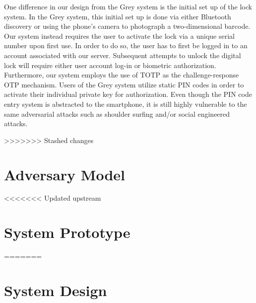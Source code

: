 \documentclass[conference]{IEEEtran}
\begin{document}
	One difference in our design from the Grey system is the initial set up of the lock system. In the Grey system, this initial set up is done via either Bluetooth discovery or using the phone’s camera to photograph a two-dimensional barcode. Our system instead requires the user to activate the lock via a unique serial number upon first use. In order to do so, the user has to first be logged in to an account associated with our server. Subsequent attempts to unlock the digital lock will require either user account log-in or biometric authorization. Furthermore, our system employs the use of TOTP as the challenge-response OTP mechanism. Users of the Grey system utilize static PIN codes in order to activate their individual private key for authorization. Even though the PIN code entry system is abstracted to the smartphone, it is still highly vulnerable to the same adversarial attacks such as shoulder surfing and/or social engineered attacks.

>>>>>>> Stashed changes

\section{Adversary Model}

<<<<<<< Updated upstream
\section{System Prototype}
=======
\section{System Design}
\end{document}
